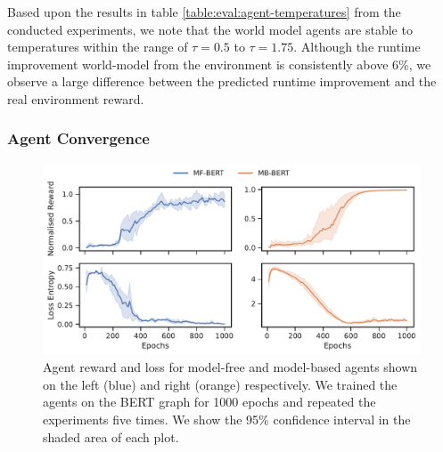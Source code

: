 Based upon the results in table \ref{table:eval:agent-temperatures} from the conducted experiments, we note that the world model agents are stable to temperatures within the range of $\tau = 0.5$ to $\tau = 1.75$. Although the runtime improvement world-model from the environment is consistently above 6\%, we observe a large difference between the predicted runtime improvement and the real environment reward.



\subsubsection{Agent Convergence}
\label{sec:eval:subsec:agent-conv}

\begin{figure}[ht]
  \centering
  \includegraphics[width=1\columnwidth]{sections/5evaluation/images/agent_convergence.pdf}
  \caption[Convergence line plots of MF and MB approaches]{Agent reward and loss for model-free and model-based agents shown on the left (blue) and right (orange) respectively. We trained the agents on the BERT graph for 1000 epochs and repeated the experiments five times. We show the 95\% confidence interval in the shaded area of each plot.}
  \label{fig:eval:agent-mf-mb-convg}
\end{figure}

